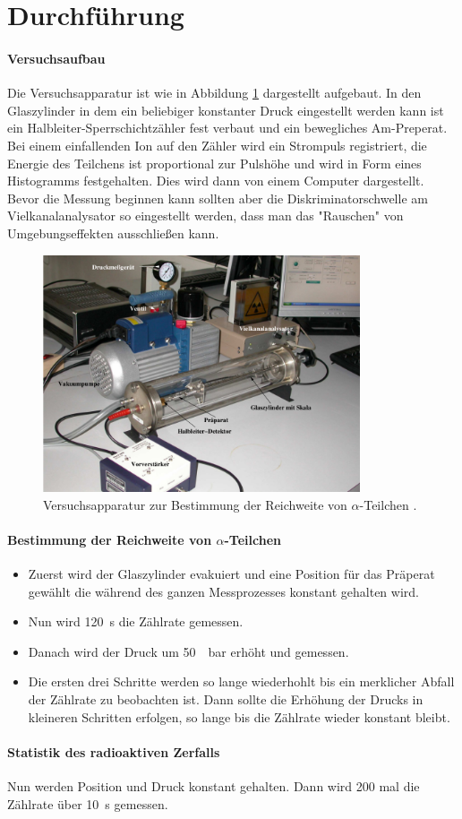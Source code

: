 \section{Durchführung}
\label{sec:Durchführung}
\paragraph{Versuchsaufbau}
Die Versuchsapparatur ist wie in Abbildung \ref{fig:VB} dargestellt aufgebaut.
In den Glaszylinder in dem ein beliebiger konstanter Druck eingestellt werden kann
ist ein Halbleiter-Sperrschichtzähler fest verbaut und ein bewegliches Am-Preperat.
Bei einem einfallenden Ion auf den Zähler wird ein Strompuls registriert,
die Energie des Teilchens ist proportional zur Pulshöhe und wird in Form eines
Histogramms festgehalten. Dies wird dann von einem Computer dargestellt. Bevor
die Messung beginnen kann sollten aber die Diskriminatorschwelle am Vielkanalanalysator
so eingestellt werden, dass man das "Rauschen" von Umgebungseffekten ausschließen kann.

\begin{figure}
  \centering
  \includegraphics[height=7cm]{logos/Versuchsaufbau.png}
  \caption{Versuchsapparatur zur Bestimmung der Reichweite von \texorpdfstring{$\alpha$}{math}-Teilchen \cite{Anleitung}.}
  \label{fig:VB}
\end{figure}
\paragraph{Bestimmung der Reichweite von \texorpdfstring{$\alpha$}{math}-Teilchen}
\begin{itemize}
  \item Zuerst wird der Glaszylinder evakuiert und eine Position für das Präperat gewählt
  die während des ganzen Messprozesses konstant gehalten wird.
  \item Nun wird \SI{120}{\second} die Zählrate gemessen.
  \item Danach wird der Druck um \SI{50}{\mili\bar} erhöht und gemessen.
  \item Die ersten drei Schritte werden so lange wiederhohlt bis ein merklicher
  Abfall der Zählrate zu beobachten ist. Dann sollte die Erhöhung der Drucks in
  kleineren Schritten erfolgen, so lange bis die Zählrate wieder konstant bleibt.
\end{itemize}
\paragraph{Statistik des radioaktiven Zerfalls}
Nun werden Position und Druck konstant gehalten. Dann wird 200 mal die
Zählrate über \SI{10}{\second} gemessen.
